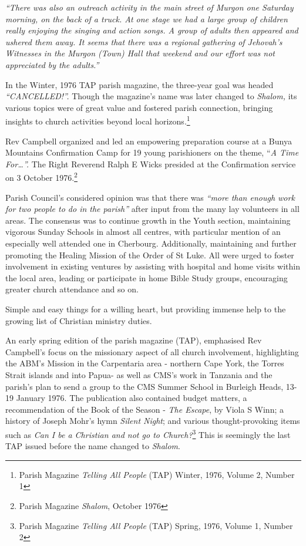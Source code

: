 \emph{``There was also an outreach activity in the main street of Murgon one Saturday morning, on the back of a truck. At one stage we had a large group of children really enjoying the singing and action songs. A group of adults then appeared and ushered them away. It seems that there was a regional gathering of Jehovah's Witnesses in the Murgon (Town) Hall that weekend and our effort was not appreciated by the adults.''}



In the Winter, 1976 TAP parish magazine, the three-year goal was headed \emph{``CANCELLED!''.} Though the magazine's name was later changed to \emph{Shalom,} its various topics were of great value and fostered parish connection, bringing insights to church activities beyond local horizons.\footnote{Parish Magazine \emph{Telling All People} (TAP) Winter, 1976, Volume 2, Number 1}


Rev Campbell organized and led an empowering preparation course at a Bunya Mountains Confirmation Camp for 19 young parishioners on the theme, ``\emph{A Time For\ldots''.} The Right Reverend Ralph E Wicks presided at the Confirmation service on 3 October 1976.\footnote{Parish Magazine \emph{Shalom}, October 1976}


Parish Council's considered opinion was that there was \emph{``more than enough work for two people to do in the parish''} after input from the many lay volunteers in all areas. The consensus was to continue growth in the Youth section, maintaining vigorous Sunday Schools in almost all centres, with particular mention of an especially well attended one in Cherbourg. Additionally, maintaining and further promoting the Healing Mission of the Order of St Luke. All were urged to foster involvement in existing ventures by assisting with hospital and home visits within the local area, leading or participate in home Bible Study groups, encouraging greater church attendance and so on.



Simple and easy things for a willing heart, but providing immense help to the growing list of Christian ministry duties.



An early spring edition of the parish magazine (TAP), emphasised Rev Campbell's focus on the missionary aspect of all church involvement, highlighting the ABM's Mission in the Carpentaria area - northern Cape York, the Torres Strait islands and into Papua- as well as CMS's work in Tanzania and the parish's plan to send a group to the CMS Summer School in Burleigh Heads, 13-19 January 1976. The publication also contained budget matters, a recommendation of the Book of the Season - \emph{The Escape}, by Viola S Winn; a history of Joseph Mohr's hymn \emph{Silent Night}; and various thought-provoking items such as \emph{Can I be a Christian and not go to Church?}\footnote{Parish Magazine \emph{Telling All People} (TAP) Spring, 1976, Volume 1, Number 2} This is seemingly the last TAP issued before the name changed to \emph{Shalom}.








